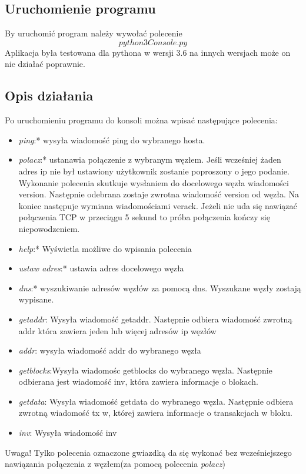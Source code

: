 \subsection{Uruchomienie programu}
By uruchomić program należy wywołać polecenie $$python3 Console.py$$
Aplikacja była testowana dla pythona w wersji 3.6 na innych wersjach może on nie działać poprawnie.
\subsection{Opis działania}

Po uruchomieniu programu do konsoli można wpisać następujące polecenia:
\begin{itemize}
\item \textit{ping}:* wysyła wiadomość ping do wybranego hosta.
\item \textit{polacz}:* ustanawia połączenie z wybranym węzłem. Jeśli wcześniej żaden adres ip nie był ustawiony użytkownik zostanie poproszony o jego podanie. Wykonanie polecenia skutkuje wysłaniem do docelowego węzła wiadomości version. Następnie odebrana zostaje zwrotna wiadomość version od węzła. Na koniec następuje wymiana wiadomościami verack. Jeżeli nie uda się nawiązać połączenia TCP w przeciągu 5 sekund to próba połączenia kończy się niepowodzeniem.
\item \textit{help}:* Wyświetla możliwe do wpisania polecenia
\item \textit{ustaw adres}:* ustawia adres docelowego węzła
\item \textit{dns}:* wyszukiwanie adresów węzłów za pomocą dns. Wyszukane węzły zostają wypisane.
\item \textit{getaddr}: Wysyła wiadomość getaddr. Następnie odbiera wiadomość zwrotną addr która zawiera jeden lub więcej adresów ip węzłów
\item \textit{addr}: wysyła wiadomość addr do wybranego węzła
\item \textit{getblocks}:Wysyła wiadomośc getblocks do wybranego węzła. Następnie odbierana jest wiadomość inv, która zawiera informacje o blokach.
\item \textit{getdata}:  Wysyła wiadomość getdata do wybranego węzła. Następnie odbiera zwrotną wiadomość tx w, której zawiera informacje o transakcjach w bloku.
\item \textit{inv}: Wysyła wiadomość inv
\end{itemize}

Uwaga! Tylko polecenia oznaczone gwiazdką da się wykonać bez wcześniejszego nawiązania połączenia z węzłem(za pomocą polecenia \textit{polacz})

